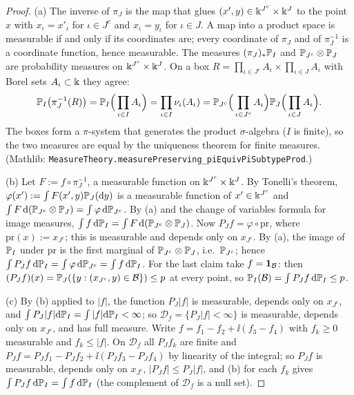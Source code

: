 \begin{proof}
(a) The inverse of $\pi_J$ is the map that glues $(x',y)\in\Bbbk^{J^c}\times\Bbbk^J$ to the point $x$ with $x_\iota=x'_\iota$ for $\iota\in J^c$ and $x_\iota=y_\iota$ for $\iota\in J$. A map into a product space is measurable if and only if its coordinates are;
every coordinate of $\pi_J$ and of $\pi_J^{-1}$ is a coordinate function, hence measurable. The measures $(\pi_J)_*\mathbb{P}_I$ and $\mathbb{P}_{J^c}\otimes\mathbb{P}_J$ are probability measures on $\Bbbk^{J^c}\times\Bbbk^J$. On a box
$R=\prod_{\iota\in J^c}A_\iota\times\prod_{\iota\in J}A_\iota$ with Borel sets $A_\iota\subset\Bbbk$ they agree:
\[
 \mathbb{P}_I\big(\pi_J^{-1}(R)\big)=\mathbb{P}_I\Big(\prod_{\iota\in I}A_\iota\Big)=\prod_{\iota\in I}\nu_\iota(A_\iota)=\mathbb{P}_{J^c}\Big(\prod_{\iota\in J^c}A_\iota\Big)\mathbb{P}_J\Big(\prod_{\iota\in J}A_\iota\Big).
\]
The boxes form a $\pi$-system that generates the product $\sigma$-algebra ($I$ is finite), so the two measures are equal by the uniqueness theorem for finite measures.
(Mathlib: \texttt{MeasureTheory.measurePreserving\_piEquivPiSubtypeProd}.)

(b) Let $F:=f\circ\pi_J^{-1}$, a measurable function on $\Bbbk^{J^c}\times\Bbbk^J$. By Tonelli's theorem, $\varphi(x'):=\int F(x',y)\mathbb{P}_J(\mathrm{d} y)$ is a measurable function of $x'\in\Bbbk^{J^c}$ and $\int F\,\mathrm{d}(\mathbb{P}_{J^c}\otimes\mathbb{P}_J)=\int\varphi\,\mathrm{d}\mathbb{P}_{J^c}$.
By (a) and the change of variables formula for image measures, $\int f\,\mathrm{d}\mathbb{P}_I=\int F\,\mathrm{d}(\mathbb{P}_{J^c}\otimes\mathbb{P}_J)$. Now $P_Jf=\varphi\circ\mathrm{pr}$, where $\mathrm{pr}(x):=x_{J^c}$; this is measurable and depends only on $x_{J^c}$. By (a), the image of $\mathbb{P}_I$ under $\mathrm{pr}$ is the first marginal of
$\mathbb{P}_{J^c}\otimes\mathbb{P}_J$, i.e.\ $\mathbb{P}_{J^c}$; hence $\int P_Jf\,\mathrm{d}\mathbb{P}_I=\int\varphi\,\mathrm{d}\mathbb{P}_{J^c}=\int f\,\mathrm{d}\mathbb{P}_I$. For the last claim take $f=\mathbf{1}_{\mathcal B}$: then $(P_Jf)(x)=\mathbb{P}_J(\{y:(x_{J^c},y)\in\mathcal B\})\le p$ at every point, so $\mathbb{P}_I(\mathcal B)=\int P_Jf\,\mathrm{d}\mathbb{P}_I\le p$.

(c) By (b) applied to $|f|$, the function $P_J|f|$ is measurable, depends only on $x_{J^c}$, and $\int P_J|f|\mathrm{d}\mathbb{P}_I=\int|f|\mathrm{d}\mathbb{P}_I<\infty$; so $\mathcal D_f=\{P_J|f|<\infty\}$ is measurable, depends only on $x_{J^c}$, and has full measure.
Write $f=f_1-f_2+\ii(f_3-f_4)$ with $f_k\ge0$ measurable and $f_k\le|f|$. On $\mathcal D_f$ all $P_Jf_k$ are finite and $P_Jf=P_Jf_1-P_Jf_2+\ii(P_Jf_3-P_Jf_4)$ by linearity of the integral; so $P_Jf$ is measurable, depends only on $x_{J^c}$, $|P_Jf|\le P_J|f|$,
and (b) for each $f_k$ gives $\int P_Jf\,\mathrm{d}\mathbb{P}_I=\int f\,\mathrm{d}\mathbb{P}_I$ (the complement of $\mathcal D_f$ is a null set).


\end{proof}
